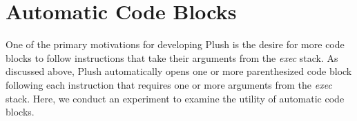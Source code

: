 









\section{Automatic Code Blocks}

One of the primary motivations for developing Plush is the desire for more code blocks to follow instructions that take their arguments from the \textit{exec} stack. As discussed above, Plush automatically opens one or more parenthesized code block following each instruction that requires one or more arguments from the \textit{exec} stack. Here, we conduct an experiment to examine the utility of automatic code blocks.


